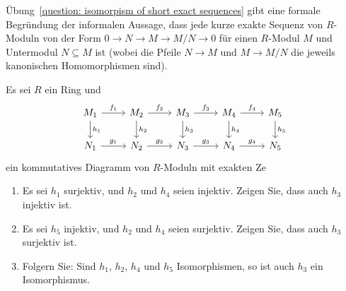 

\begin{remark*}
  Übung~\ref{question: isomorpism of short exact sequences} gibt eine formale Begründung der informalen Aussage, dass jede kurze exakte Sequenz von $R$-Moduln von der Form $0 \to N \to M \to M/N \to 0$ für einen $R$-Modul $M$ und Untermodul $N \subseteq M$ ist (wobei die Pfeile $N \to M$ und $M \to M/N$ die jeweils kanonischen Homomorphismen sind).
\end{remark*}


\begin{question}[subtitle = Zwei Vierer- und ein Fünferlemma]
  \label{question: the five lemma}
  Es sei $R$ ein Ring und
  \[
    \begin{tikzcd}[ampersand replacement=\&]
          M_1
          \arrow{r}{f_1}
          \arrow{d}{h_1}
      \&  M_2
          \arrow{r}{f_2}
          \arrow{d}{h_2}
      \&  M_3
          \arrow{r}{f_3}
          \arrow{d}{h_3}
      \&  M_4
          \arrow{r}{f_4}
          \arrow{d}{h_4}
      \&  M_5
          \arrow{d}{h_5}
      \\
          N_1
          \arrow{r}{g_1}
      \&  N_2
          \arrow{r}{g_2}
      \&  N_3
          \arrow{r}{g_3}
      \&  N_4
          \arrow{r}{g_4}
      \&  N_5
    \end{tikzcd}
  \]
  ein kommutatives Diagramm von $R$-Moduln mit exakten Ze
  \begin{enumerate}
    \item
      Es sei $h_1$ surjektiv, und $h_2$ und $h_4$ seien injektiv.
      Zeigen Sie, dass auch $h_3$ injektiv ist.
    \item
      Es sei $h_5$ injektiv, und $h_2$ und $h_4$ seien surjektiv.
      Zeigen Sie, dass auch $h_3$ surjektiv ist.
    \item
      Folgern Sie:
      Sind $h_1$, $h_2$, $h_4$ und $h_5$ Isomorphismen, so ist auch $h_3$ ein Isomorphismus.
  \end{enumerate}
\end{question}




